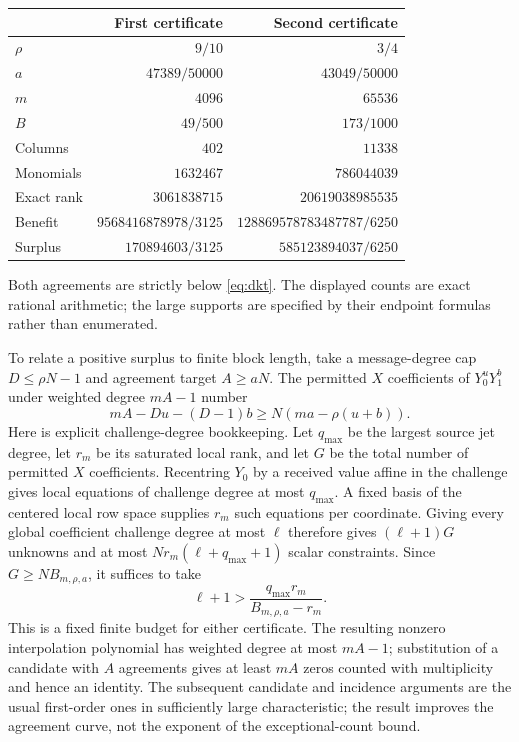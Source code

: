 \documentclass[11pt]{article}
\theoremstyle{remark}\newtheorem{remark}[theorem]{Remark}
\begin{document}
\begin{center}
\small
\begin{tabular}{@{}lrr@{}}\toprule
 & First certificate & Second certificate\\\midrule
$\rho$ & $9/10$ & $3/4$\\
$a$ & $47389/50000$ & $43049/50000$\\
$m$ & $4096$ & $65536$\\
$B$ & $49/500$ & $173/1000$\\
Columns & $402$ & $11338$\\
Monomials & $1632467$ & $786044039$\\
Exact rank & $3061838715$ & $20619038985535$\\
Benefit & $9568416878978/3125$ & $128869578783487787/6250$\\
Surplus & $170894603/3125$ & $585123894037/6250$\\\bottomrule
\end{tabular}
\end{center}
Both agreements are strictly below \eqref{eq:dkt}. The displayed counts are exact rational arithmetic; the large supports are specified by their endpoint formulas rather than enumerated.

To relate a positive surplus to finite block length, take a message-degree cap $D\le\rho N-1$ and agreement target $A\ge aN$. The permitted $X$ coefficients of $Y_0^uY_1^b$ under weighted degree $mA-1$ number
\[
 mA-Du-(D-1)b\ge N(ma-\rho(u+b)).
\]
Here is explicit challenge-degree bookkeeping. Let $q_{\max}$ be the largest source jet degree, let $r_m$ be its saturated local rank, and let $G$ be the total number of permitted $X$ coefficients. Recentring $Y_0$ by a received value affine in the challenge gives local equations of challenge degree at most $q_{\max}$. A fixed basis of the centered local row space supplies $r_m$ such equations per coordinate. Giving every global coefficient challenge degree at most $\ell$ therefore gives $(\ell+1)G$ unknowns and at most $Nr_m(\ell+q_{\max}+1)$ scalar constraints. Since $G\ge NB_{m,\rho,a}$, it suffices to take
\[
 \ell+1>\frac{q_{\max}r_m}{B_{m,\rho,a}-r_m}.
\]
This is a fixed finite budget for either certificate. The resulting nonzero interpolation polynomial has weighted degree at most $mA-1$; substitution of a candidate with $A$ agreements gives at least $mA$ zeros counted with multiplicity and hence an identity. The subsequent candidate and incidence arguments are the usual first-order ones in sufficiently large characteristic; the result improves the agreement curve, not the exponent of the exceptional-count bound.
\end{document}
